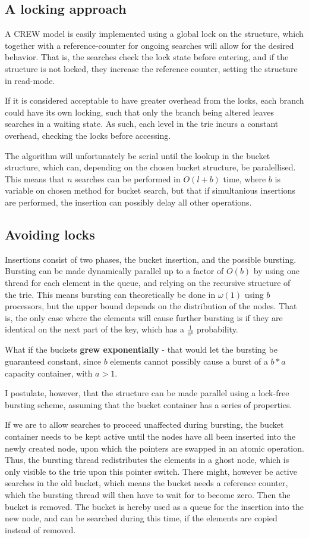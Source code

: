 \documentclass[11pt,a4paper]{article}
\begin{document}
\subsection{A locking approach}
A CREW model is easily implemented using a global lock on the structure, which
together with a reference-counter for ongoing searches will allow for the
desired behavior. That is, the searches check the lock state before entering,
and if the structure is not locked, they increase the reference counter,
setting the structure in read-mode.


If it is considered acceptable to have greater overhead from the locks, each
branch could have its own locking, such that only the branch being altered
leaves searches in a waiting state. As such, each level in the trie incurs a
constant overhead, checking the locks before accessing.

The algorithm will unfortunately be serial until the lookup in the bucket
structure, which can, depending on the chosen bucket structure, be
paralellised. This means that $n$ searches can be performed in $O(l+b)$ time,
where $b$ is variable on chosen method for bucket search, but that if
simultanious insertions are performed, the insertion can possibly delay all
other operations.

\subsection{Avoiding locks}
Insertions consist of two phases, the bucket insertion, and the possible
bursting. Bursting can be made dynamically parallel up to a factor of $O(b)$ by
using one thread for each element in the queue, and relying on the recursive
structure of the trie. This means bursting can theoretically be done in
$\omega(1)$ using $b$ processors, but the upper bound depends on the
distribution of the nodes. That is, the only case where the elements will cause
further bursting is if they are identical on the next part of the key, which
has a $\frac{1}{\alpha^b}$ probability.

What if the buckets {\bf grew exponentially} - that would let the bursting be
guaranteed constant, since $b$ elements cannot possibly cause a burst of a
$b*a$ capacity container, with $a > 1$.


I postulate, however, that the structure can be made parallel using a lock-free
bursting scheme, assuming that the bucket container has a series of properties.

If we are to allow searches to proceed unaffected during bursting, the bucket
container needs to be kept active until the nodes have all been inserted into the
newly created node, upon which the pointers are swapped in an atomic operation.
Thus, the bursting thread redistributes the elements in a ghost node, which is
only visible to the trie upon this pointer switch. There might, however be
active searches in the old bucket, which means the bucket needs a reference
counter, which the bursting thread will then have to wait for to become zero.
Then the bucket is removed. The bucket is hereby used as a queue for the
insertion into the new node, and can be searched during this time, if the
elements are copied instead of removed.
\end{document}
